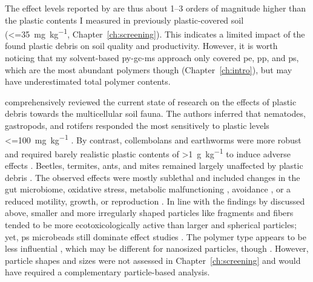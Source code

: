 The effect levels reported by \citet{deSouzaMachadoMicroplastics2019,GaoEffects2019} are thus about \numrange{1}{3} orders of magnitude higher than the plastic contents I measured in previously plastic-covered soil (\SI{<=35}{\milli\gram\per\kilo\gram}, Chapter~\ref{ch:screening}). This indicates a limited impact of the found plastic debris on soil quality and productivity. However, it is worth noticing that my solvent-based \ac{py-gc-ms} approach only covered \ac{pe}, \ac{pp}, and \ac{ps}, which are the most abundant polymers though (Chapter~\ref{ch:intro}), but may have underestimated total polymer contents.

 comprehensively reviewed the current state of research on the effects of plastic debris towards the multicellular soil fauna. The authors inferred that nematodes, gastropods, and rotifers responded the most sensitively to plastic levels \SI{<=100}{\milli\gram\per\kilo\gram} \citep[for instance,][]{KimSizedependent2020,SongUptake2019}. By contrast, collembolans and earthworms were more robust and required barely realistic plastic contents of \SI{>1}{\gram\per\kilo\gram} to induce adverse effects \citep{JuEffects2019,DingEffect2021,LahiveMicroplastic2019}. Beetles, termites, ants, and mites remained largely unaffected by plastic debris \citep[for instance,][]{PengBiodegradation2019,ZhuTrophic2018}. The observed effects were mostly sublethal and included changes in the gut microbiome, oxidative stress, metabolic malfunctioning \citep{JuEffects2019,ChenDefense2020,Rodriguez-SeijoOxidative2018}, avoidance \citep{DingEffect2021}, or a reduced motility, growth, or reproduction \citep{BootsEffects2019,LahiveMicroplastic2019}. In line with the findings by \citet{deSouzaMachadoMicroplastics2019} discussed above, smaller and more irregularly shaped particles like fragments and fibers tended to be more ecotoxicologically active than larger and spherical particles; yet, \ac{ps} microbeads still dominate effect studies \citep{BuksWhat2020}. The polymer type appears to be less influential \citep{RilligMicroplastic2020}, which may be different for nanosized particles, though \citep{RilligMicroplastic2019}. However, particle shapes and sizes were not assessed in Chapter~\ref{ch:screening} and would have required a complementary particle-based analysis.

